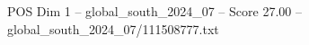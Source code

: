 \begin{textsample}{POS Dim 1 – global\_south\_2024\_07 – Score 27.00 – global\_south\_2024\_07/111508777.txt}
\end{textsample}
